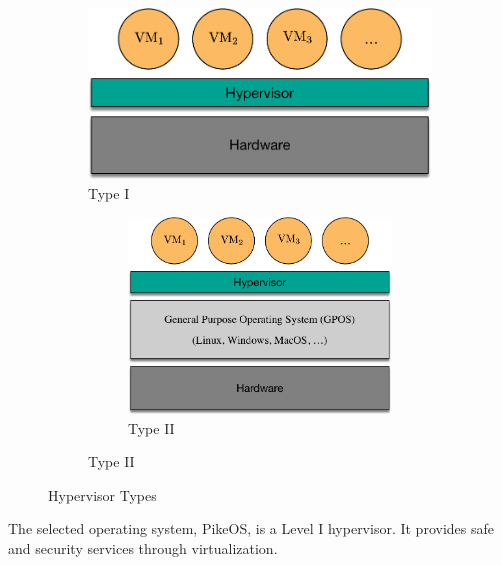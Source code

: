 \begin{figure}
  \begin{subfigure}{0.5\textwidth}
    \centering
    \includegraphics[width=.9\textwidth]{HypervisorL1}
    \caption{Type I}
    \label{fig:HypervisorL1}
  \end{subfigure}%
  \begin{subfigure}{0.5\textwidth}
    \begin{subfigure}{\textwidth}
      \centering
      \includegraphics[width=.8\textwidth]{HypervisorL2}
      \caption{Type II}
      \label{fig:HypervisorL2}
    \end{subfigure}
  \end{subfigure}
  \caption{Hypervisor Types}
  \label{fig:interactions}
\end{figure}
The selected operating system, PikeOS, is a Level I hypervisor. It provides safe and security services through virtualization.

